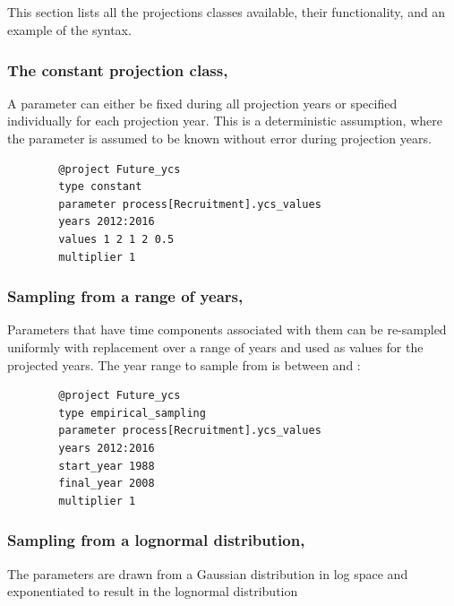 \subsection{\label{sec:projections}}

This section lists all the projections classes available, their functionality, and an example of the syntax.

\subsubsection[Constant]{The constant projection class, }

A parameter can either be fixed during all projection years or specified individually for each projection year. This is a deterministic assumption, where the parameter is assumed to be known without error during projection years.

{\small{\begin{verbatim}
		@project Future_ycs
		type constant
		parameter process[Recruitment].ycs_values
		years 2012:2016
		values 1 2 1 2 0.5
		multiplier 1
		\end{verbatim}}}

\subsubsection[Empirical resampling]{Sampling from a range of years, }

Parameters that have time components associated with them can be re-sampled uniformly with replacement over a range of years and used as values for the projected years. The year range to sample from is between  and :

{\small{\begin{verbatim}
		@project Future_ycs
		type empirical_sampling
		parameter process[Recruitment].ycs_values
		years 2012:2016
		start_year 1988
		final_year 2008
		multiplier 1
		\end{verbatim}}}


\subsubsection[Lognormal]{Sampling from a lognormal distribution, }

The parameters are drawn from a Gaussian distribution in log space and exponentiated  to result in the lognormal distribution

